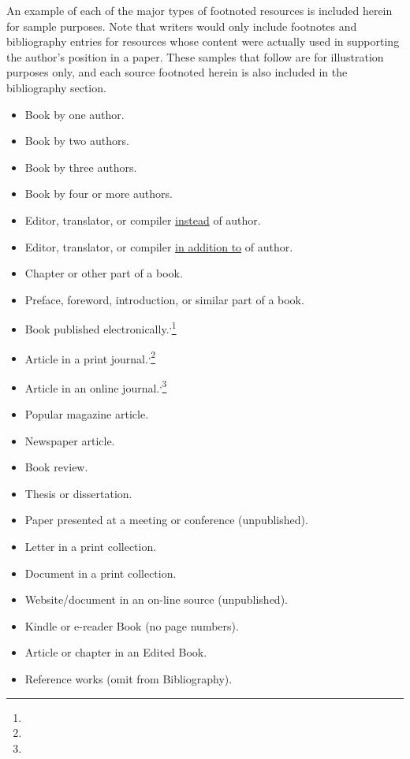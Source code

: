 \documentclass[raggedright]{turabian-researchpaper}
\begin{document}
An example of each of the major types of footnoted resources is included herein
for sample purposes. Note that writers would only include footnotes and
bibliography entries for resources whose content were actually used in
supporting the author's position in a paper. These samples that follow are for
illustration purposes only, and each source footnoted herein is also included in
the bibliography section.
\begin{itemize}
\item Book by one author.\autocite[65]{Turabian}
\item Book by two authors.\autocite[104--7]{Turabian}
\item Book by three authors.\autocite[11-12]{Turabian}
\item Book by four or more authors.\autocite[262]{Turabian}
\item Editor, translator, or compiler \underline{instead} of
  author.\autocite[91--92]{Turabian}
\item Editor, translator, or compiler \underline{in addition to} of
  author.\autocite[22]{Turabian}
\item Chapter or other part of a book.\autocite[101--2]{Turabian}
\item Preface, foreword, introduction, or similar part of a
  book.\autocite[xx--xxi]{Turabian}
\item Book published
  electronically.\autocite{Turabian}\textsuperscript{,}\footnote{}
\item Article in a print
  journal.\autocite[639]{Turabian}\textsuperscript{,}\footnote{}
\item Article in an online
  journal.\autocite{Turabian}\textsuperscript{,}\footnote{}
\item Popular magazine article.\autocite[84]{Turabian}
\item Newspaper article.\autocite[B 12]{Turabian}
\item Book review.\autocite[16]{Turabian}
\item Thesis or dissertation.\autocite[22--29, 35]{Turabian}
\item Paper presented at a meeting or conference
  (unpublished).\autocite{Turabian}
\item Letter in a print collection.\autocite[199-200]{Turabian}
\item Document in a print collection.\autocite[19-23]{Turabian}
\item Website/document in an on-line source (unpublished).\autocite{Turabian}
\item Kindle or e-reader Book (no page numbers).\autocite[loc. 103,
  Kindle]{Turabian}
\item Article or chapter in an Edited Book.\autocite[68]{Turabian}
\item Reference works (omit from Bibliography).\autocite{Turabian}
\end{itemize}
\end{document}
